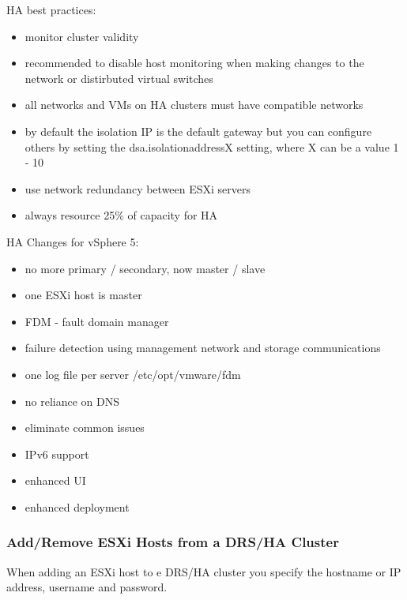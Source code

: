 HA best practices:

\begin{itemize}

\item monitor cluster validity

\item recommended to disable host monitoring when making changes to the
network or distirbuted virtual switches

\item all networks and VMs on HA clusters must have compatible networks

\item by default the isolation IP is the default gateway but you can configure
others by setting the dsa.isolationaddressX setting, where X can be a value 1
- 10

\item use network redundancy between ESXi servers

\item always resource 25\% of capacity for HA
\end{itemize}

HA Changes for vSphere 5:

\begin{itemize}

\item no more primary / secondary, now master / slave
\item one ESXi host is master
\item FDM - fault domain manager
\item failure detection using management network and storage communications
\item one log file per server /etc/opt/vmware/fdm
\item no reliance on DNS
\item eliminate common issues
\item IPv6 support
\item enhanced UI
\item enhanced deployment

\end{itemize}

\subsubsection{Add/Remove ESXi Hosts from a DRS/HA Cluster}

When adding an ESXi host to e DRS/HA cluster you specify the hostname or
IP address, username and password.

